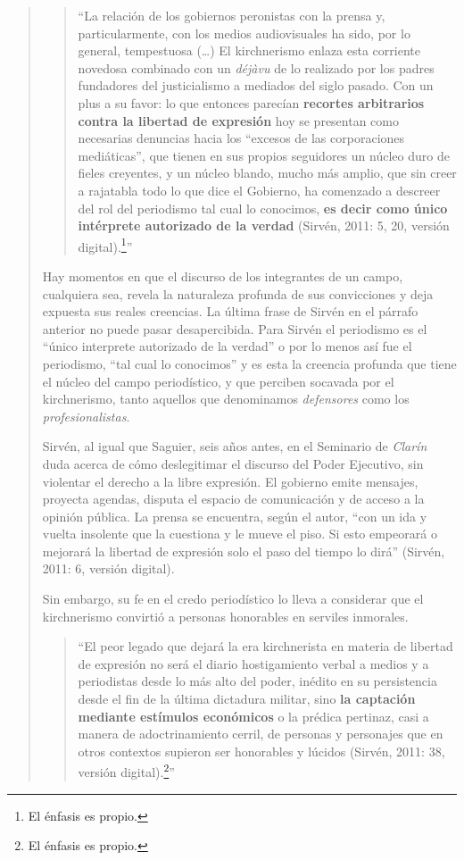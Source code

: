 \begin{quote}
\begin{quote}
	\enquote{La relación de los gobiernos peronistas con la prensa y, particularmente, con los medios audiovisuales ha sido, por lo general, tempestuosa (\dots) El kirchnerismo enlaza esta corriente novedosa combinado con un \emph{déjàvu} de lo realizado por los padres fundadores del justicialismo a mediados del siglo pasado. Con un plus a su favor: lo que entonces parecían \textbf{recortes arbitrarios contra la libertad de expresión} hoy se presentan como necesarias denuncias hacia los ``excesos de las corporaciones mediáticas'', que tienen en sus propios seguidores un núcleo duro de fieles creyentes, y un núcleo blando, mucho más amplio, que sin creer a rajatabla todo lo que dice el Gobierno, ha comenzado a descreer del rol del periodismo tal cual lo conocimos, \textbf{es decir como único intérprete autorizado de la verdad} (Sirvén, 2011: 5, 20, versión digital).\footnote{El énfasis es propio.}}
\end{quote}


Hay momentos en que el discurso de los integrantes de un campo, cualquiera sea, revela la naturaleza profunda de sus convicciones y deja expuesta sus reales creencias. La última frase de Sirvén en el párrafo anterior no puede pasar desapercibida. Para Sirvén el periodismo es el ``único interprete autorizado de la verdad'' o por lo menos así fue el periodismo, ``tal cual lo conocimos'' y es esta la creencia profunda que tiene el núcleo del campo periodístico, y que perciben socavada por el kirchnerismo, tanto aquellos que denominamos \emph{defensores} como los \emph{profesionalistas}.

Sirvén, al igual que Saguier, seis años antes, en el Seminario de \emph{Clarín }duda acerca de cómo deslegitimar el discurso del Poder Ejecutivo, sin violentar el derecho a la libre expresión. El gobierno emite mensajes, proyecta agendas, disputa el espacio de comunicación y de acceso a la opinión pública. La prensa se encuentra, según el autor, \enquote{con un ida y vuelta insolente que la cuestiona y le mueve el piso. Si esto empeorará o mejorará la libertad de expresión solo el paso del tiempo lo dirá} (Sirvén, 2011: 6, versión digital).

Sin embargo, su fe en el credo periodístico lo lleva a considerar que el kirchnerismo convirtió a personas honorables en serviles inmorales.

\begin{quote}
	\enquote{El peor legado que dejará la era kirchnerista en materia de libertad de expresión no será el diario hostigamiento verbal a medios y a periodistas desde lo más alto del poder, inédito en su persistencia desde el fin de la última dictadura militar, sino \textbf{la captación mediante estímulos económicos} o la prédica pertinaz, casi a manera de adoctrinamiento cerril, de personas y personajes que en otros contextos supieron ser honorables y lúcidos (Sirvén, 2011: 38, versión digital).\footnote{El énfasis es propio.}}
\end{quote}



\end{quote}
